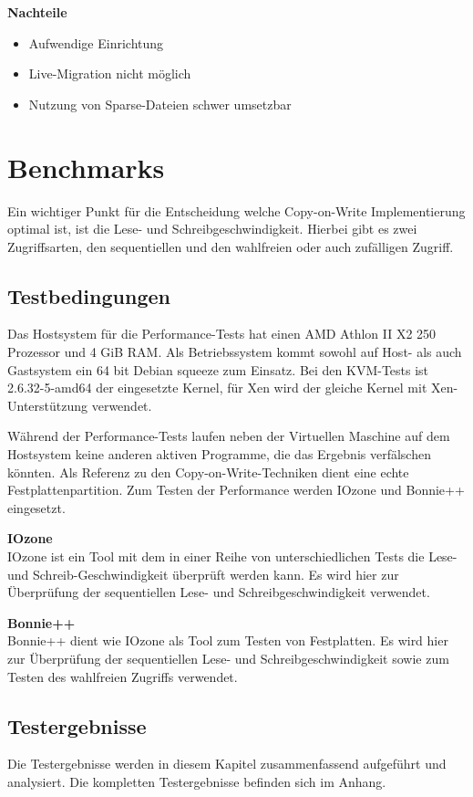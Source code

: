 \textbf{Nachteile}
\begin{itemize}
 \item Aufwendige Einrichtung
 \item Live-Migration nicht möglich
 \item Nutzung von Sparse-Dateien schwer umsetzbar
\end{itemize}
{\fontsize{12.1pt}{15.8pt}\selectfont
\section{Benchmarks}
Ein wichtiger Punkt für die Entscheidung welche Copy-on-Write Implementierung optimal ist, ist die Lese- und Schreibgeschwindigkeit. Hierbei gibt es zwei Zugriffsarten, den sequentiellen und den wahlfreien oder auch zufälligen Zugriff. 

\subsection{Testbedingungen}
Das Hostsystem für die Performance-Tests hat einen AMD Athlon II X2 250 Prozessor und 4 GiB RAM. Als Betriebssystem kommt sowohl auf Host- als auch Gastsystem ein 64 bit Debian squeeze zum Einsatz. Bei den KVM-Tests ist 2.6.32-5-amd64 der eingesetzte Kernel, für Xen wird der gleiche Kernel mit Xen-Unterstützung verwendet.

Während der Performance-Tests laufen neben der Virtuellen Maschine auf dem Hostsystem keine anderen aktiven Programme, die das Ergebnis verfälschen könnten. Als Referenz zu den Copy-on-Write-Techniken dient eine echte Festplattenpartition. Zum Testen der Performance werden IOzone und Bonnie++ eingesetzt.
}

\textbf{IOzone} \\
IOzone ist ein Tool mit dem in einer Reihe von unterschiedlichen Tests die Lese- und Schreib-Geschwindigkeit überprüft werden kann. Es wird hier zur Überprüfung der sequentiellen Lese- und Schreibgeschwindigkeit verwendet.

\textbf{Bonnie++} \\
Bonnie++ dient wie IOzone als Tool zum Testen von Festplatten. Es wird hier zur Überprüfung der sequentiellen Lese- und Schreibgeschwindigkeit sowie zum Testen des wahlfreien Zugriffs verwendet.

\subsection{Testergebnisse}
Die Testergebnisse werden in diesem Kapitel zusammenfassend aufgeführt und analysiert. Die kompletten Testergebnisse befinden sich im Anhang.

